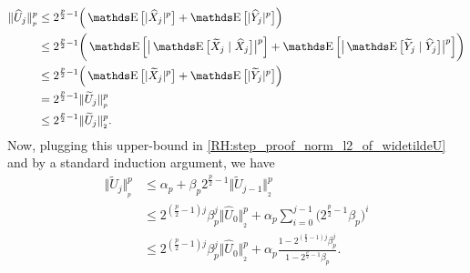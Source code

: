 \begin{equation}
	\begin{aligned}
		\Vert \widehat U_j \Vert_{_p}^p
		 & \leq 2^{\frac{p}{2}-1} \Big( \E \big[ \vert \widehat X_j \vert^p \big] + \E \big[ \vert \widehat Y_j \vert^p \big] \Big)                                                                                         \\
		 & \leq 2^{\frac{p}{2}-1} \bigg( \E \Big[ \big\vert \E \big[ \widetilde X_j \mid \widehat X_j \big] \big\vert^p \Big] + \E \Big[ \big\vert \E \big[ \widetilde Y_j \mid \widehat Y_j \big] \big\vert^p \Big] \bigg) \\
		 & \leq 2^{\frac{p}{2}-1} \Big( \E \big[ \vert \widetilde X_j \vert^p \big] + \E \big[ \vert \widetilde Y_j \vert^p \big] \Big)                                                                                     \\
		 & = 2^{\frac{p}{2}-1} \Vert \widetilde U_j \Vert_{_p}^p                                                                                                                                                            \\
		 & \leq 2^{\frac{p}{2}-1} \Vert \widetilde U_j \Vert_{_2}^p.
	\end{aligned}
\end{equation}
Now, plugging this upper-bound in \eqref{RH:step_proof_norm_l2_of_widetildeU} and by a standard induction argument, we have
\begin{equation}\label{RH:upperbound_widetildeU}
	\begin{aligned}
		\Vert \widetilde U_j \Vert_{_p}^p
		 & \leq \alpha_{p} + \beta_{p} 2^{\frac{p}{2}-1} \Vert \widetilde U_{j-1} \Vert_{_2}^p                                                                                  \\
		 & \leq 2^{(\frac{p}{2}-1 )j} \beta_{p}^j \Vert \widehat U_0 \Vert_{_2}^p + \alpha_{p} \sum_{i=0}^{j-1} \big( 2^{\frac{p}{2}-1} \beta_{p} \big)^{i}                     \\
		 & \leq 2^{(\frac{p}{2}-1 )j} \beta_{p}^j \Vert \widehat U_0 \Vert_{_2}^p + \alpha_{p} \frac{1 - 2^{(\frac{p}{2}-1 )j} \beta_{p}^j }{1 - 2^{\frac{p}{2}-1} \beta_{p} }.
	\end{aligned}
\end{equation}
